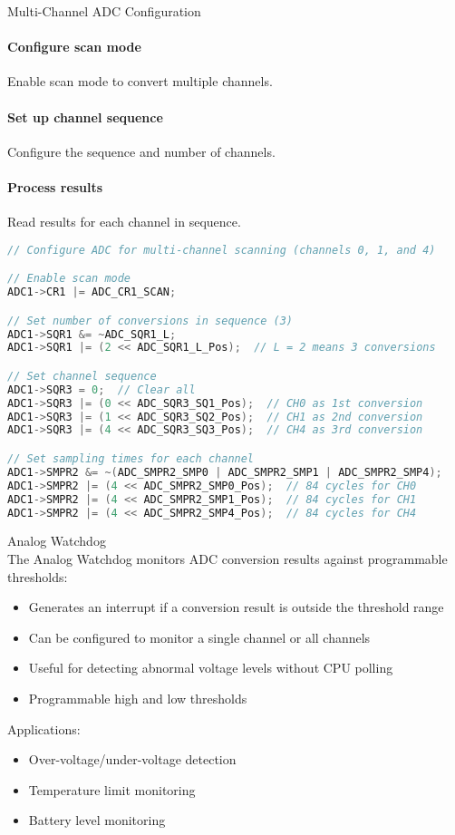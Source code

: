 \begin{KR}{Multi-Channel ADC Configuration}
\paragraph{Configure scan mode}
Enable scan mode to convert multiple channels.
\paragraph{Set up channel sequence}
Configure the sequence and number of channels.
\paragraph{Process results}
Read results for each channel in sequence.

\begin{lstlisting}[language=C, style=basesmol]
// Configure ADC for multi-channel scanning (channels 0, 1, and 4)

// Enable scan mode
ADC1->CR1 |= ADC_CR1_SCAN;

// Set number of conversions in sequence (3)
ADC1->SQR1 &= ~ADC_SQR1_L;
ADC1->SQR1 |= (2 << ADC_SQR1_L_Pos);  // L = 2 means 3 conversions

// Set channel sequence
ADC1->SQR3 = 0;  // Clear all
ADC1->SQR3 |= (0 << ADC_SQR3_SQ1_Pos);  // CH0 as 1st conversion
ADC1->SQR3 |= (1 << ADC_SQR3_SQ2_Pos);  // CH1 as 2nd conversion
ADC1->SQR3 |= (4 << ADC_SQR3_SQ3_Pos);  // CH4 as 3rd conversion

// Set sampling times for each channel
ADC1->SMPR2 &= ~(ADC_SMPR2_SMP0 | ADC_SMPR2_SMP1 | ADC_SMPR2_SMP4);
ADC1->SMPR2 |= (4 << ADC_SMPR2_SMP0_Pos);  // 84 cycles for CH0
ADC1->SMPR2 |= (4 << ADC_SMPR2_SMP1_Pos);  // 84 cycles for CH1
ADC1->SMPR2 |= (4 << ADC_SMPR2_SMP4_Pos);  // 84 cycles for CH4
\end{lstlisting}
\end{KR}

\begin{concept}{Analog Watchdog}\\
The Analog Watchdog monitors ADC conversion results against programmable thresholds:
\begin{itemize}
    \item Generates an interrupt if a conversion result is outside the threshold range
    \item Can be configured to monitor a single channel or all channels
    \item Useful for detecting abnormal voltage levels without CPU polling
    \item Programmable high and low thresholds
\end{itemize}
Applications:
\begin{itemize}
    \item Over-voltage/under-voltage detection
    \item Temperature limit monitoring
    \item Battery level monitoring
\end{itemize}
\end{concept}

